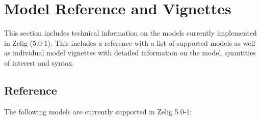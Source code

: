 \documentclass[letterpaper,10pt,english]{sphinxmanual}
\begin{document}
\chapter{Model Reference and Vignettes}
\label{vignette:vignettes}\label{vignette:model-reference-and-vignettes}\label{vignette::doc}
This section includes technical information on the models currently implemented in Zelig (5.0-1). This includes a reference with a list of supported models as well as individual model vignettes with detailed information on the model, quantities of interest and syntax.


\section{Reference}
\label{vignette:reference}
The following models are currently supported in Zelig 5.0-1:
\end{document}
